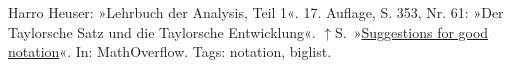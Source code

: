 \documentclass[a4paper,11pt,fleqn,twoside,BCOR=16mm]{scrartcl}
\begin{document}
\begin{thebibliography}{xx}
 Harro Heuser: »Lehrbuch der Analysis, Teil 1«.
  17. Auflage, S. 353, Nr. 61: »Der Taylorsche Satz und die Taylorsche
  Entwicklung«. $\uparrow$S.\,\pageref{bref:Heuser}
»\href{https://mathoverflow.net/questions/42929/suggestions-for-good-notation}%
{Suggestions for good notation}«.
  In: MathOverflow. Tags: notation, biglist.
\end{thebibliography}
\end{document}
